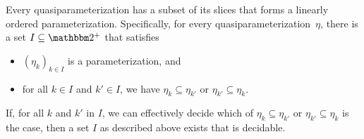 \begin{lemma}
\label{lem:cofinal_chain}%
  Every quasiparameterization has a subset of its slices that forms a linearly ordered parameterization.
  Specifically, for every quasiparameterization~$\eta$, there is a set $I \subseteq \binary^+$ that satisfies
  \begin{itemize}
  \item $(\eta_k)_{k \in I}$ is a parameterization, and
  \item for all $k \in I$ and $k' \in I$, we have $\eta_k \subseteq \eta_{k'}$ or $\eta_{k'} \subseteq \eta_k$.
  \end{itemize}
  If, for all $k$ and $k'$ in $I$, we can effectively decide which of $\eta_k \subseteq \eta_{k'}$ or $\eta_{k'} \subseteq \eta_k$ is the case, then a set $I$ as described above exists that is decidable.
\end{lemma}
